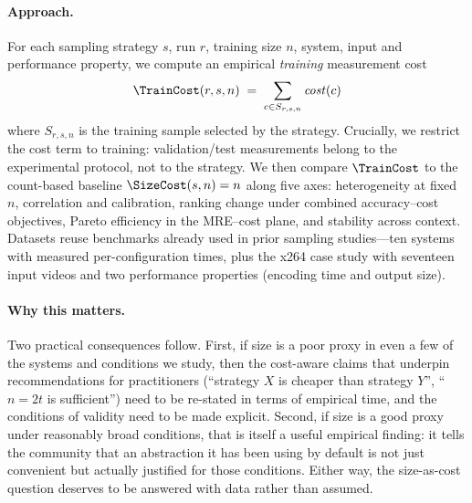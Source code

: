 \paragraph*{Approach.}
For each sampling strategy $s$, run $r$, training size $n$, system, input and
performance property, we compute an empirical \emph{training} measurement
cost
\[
\TrainCost(r,s,n)\;=\;\sum_{c\in S_{r,s,n}} \mathit{cost}(c)
\]
where $S_{r,s,n}$ is the training sample selected by the strategy. Crucially,
we restrict the cost term to training: validation/test measurements belong to
the experimental protocol, not to the strategy. We then compare
$\TrainCost$ to the count-based baseline $\SizeCost(s,n)=n$ along five axes:
heterogeneity at fixed $n$, correlation and calibration, ranking change under
combined accuracy--cost objectives, Pareto efficiency in the MRE--cost plane,
and stability across context. Datasets reuse benchmarks already used in prior
sampling studies---ten systems with measured per-configuration times,
plus the x264 case study with seventeen input videos and two performance
properties (encoding time and output size).

\paragraph*{Why this matters.}
Two practical consequences follow. First, if size is a poor proxy in even a few
of the systems and conditions we study, then the cost-aware claims that
underpin recommendations for practitioners (``strategy $X$ is cheaper than
strategy $Y$'', ``$n=2t$ is sufficient'') need to be re-stated in terms of
empirical time, and the conditions of validity need to be made explicit. Second,
if size is a good proxy under reasonably broad conditions, that is itself a
useful empirical finding: it tells the community that an abstraction it has
been using by default is not just convenient but actually justified for those
conditions. Either way, the size-as-cost question deserves to be answered with
data rather than assumed.

